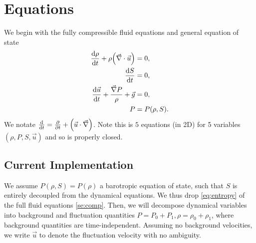 \documentclass[11pt,
        usenames, %
        dvipsnames %
    ]{article}
\newcommand*{\rd}[2]{\frac{\mathrm{d}#1}{\mathrm{d}#2}}
\newcommand*{\pd}[2]{\frac{\partial#1}{\partial#2}}
\DeclarePairedDelimiter\p{\lparen}{\rparen}
\begin{document}
\def\Snospace~{\S{}} %
\renewcommand*{\sectionautorefname}{\Snospace}
\renewcommand*{\appendixautorefname}{\Snospace}
\renewcommand*{\figureautorefname}{Fig.}
\renewcommand*{\equationautorefname}{Eq.}
\renewcommand*{\tableautorefname}{Tab.}

\onehalfspacing

\pagestyle{fancy}
\rhead{}
\cfoot{\thepage/\pageref{LastPage}}

\section{Equations}

We begin with the fully compressible fluid equations and general equation of
state
\begin{subequations}\label{se:comp}
    \begin{align}
        \rd{\rho}{t} + \rho \p*{\vec{\nabla} \cdot \vec{u}} &= 0,
            \label{eq:density}\\
        \rd{S}{t} &= 0,\label{eq:entropy}\\
        \rd{\vec{u}}{t} + \frac{\vec{\nabla}P}{\rho} + \vec{g} &= 0,
            \label{eq:velocity}\\
        P &= P(\rho, S).\label{eq:eos}
    \end{align}
\end{subequations}
We notate $\rd{}{t} = \pd{}{t} + \p*{\vec{u} \cdot \vec{\nabla}}$. Note this is
$5$ equations (in 2D) for 5 variables $(\rho, P, S, \vec{u})$ and so is properly
closed.

\subsection{Current Implementation}

We assume $P(\rho, S) = P(\rho)$ a barotropic equation of state, such that $S$
is entirely decoupled from the dynamical equations. We thus drop
\autoref{eq:entropy} of the full fluid equations \autoref{se:comp}. Then, we
will decompose dynamical variables into background and fluctuation quantities $P
= P_0 + P_1, \rho = \rho_0 + \rho_1$, where background quantities are
time-independent. Assuming no background velocities, we write $\vec{u}$ to
denote the fluctuation velocity with no ambiguity.
\end{document}
